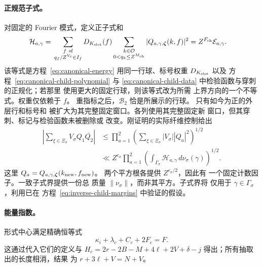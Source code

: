 \paragraph{正规范子式。}
对固定的 Fourier 模式，定义正子式和
\begin{equation}\label{eq:inverse-positive-child}
 \begin{split}
 \mathcal H_{a,\gamma}={}&
 \sum_{\substack{f\ {\rm sf}\\q_f/Z^{V_c}\in I_f}}
 D_{K_{\rm slot}}(f)
 \sum_{\substack{k\in\mathcal O\\0<q_k\le Z^{M_{\rm ch}}}}
 |Q_{a,\gamma,\boldsymbol\zeta}(k,f)|^2
 =Z^{F_{\rm ch}}\mathcal E_{a,\gamma}.
 \end{split}
\end{equation}
该等式是方程~\eqref{eq:canonical-energy} 用同一行球、标号权重
\(D_{K_{\rm slot}}\) 以及
方程~\eqref{eq:canonical-child-polynomial}
与 \eqref{eq:canonical-child-data} 中检验函数与穿刺的正规化；若那里
使用更大的固定行球，则该等式改为所需
上界方向的一个不等式。权重仅依赖于 \(f\)。
重指标之后，\(\mathcal B_2\) 恰是所展示的行球。
只有如今为正的外层行和标号和
被扩大为其完整固定窗口。各列使用其完整固定新
窗口，但其穿刺、标记与检验函数未被删除或
改变。刚证明的实际纤维控制给出
\[
 \begin{split}
 \left|\sum_{\xi\in\Xi_\sigma}V_\sigma Q_1\overline{Q_2}\right|
 &\le\prod_{a=1}^2
       \left(\sum_{\xi\in\Xi_\sigma}|V_\sigma||Q_a|^2\right)^{1/2}\\
 &\ll Z^{c_\sigma}\prod_{a=1}^2
       \left(\int_{\Gamma_\sigma}\mathcal H_{a,\gamma}
                    \,d\nu_\sigma(\gamma)\right)^{1/2}.
 \end{split}
\]
这里 \(Q_a=Q_{a,\gamma,\boldsymbol\zeta}(k_{\rm new},f_{\rm new})\)。
两个平方根各提供 \(Z^{c_\sigma/2}\)，因此有
一个固定计数因子。一致子式界提供一份总
质量 \(\|\nu_\sigma\|\)，而非其平方。子式界将
仅用于 \(\gamma\in\Gamma_\sigma\)，利用已在
方程~\eqref{eq:inverse-child-margins} 中验证的假设。

\paragraph{能量指数。}
形式中心满足精确恒等式
\begin{equation}\label{eq:canonical-prefactor}
 \kappa_i+\lambda_c+C_c+2F_c=F.
\end{equation}
这通过代入它们的定义与
\(H_c=2r-2B-M+4\ell+2V+\delta-j\) 得出；所有抽取出的长度相消，结果
为 \(r+3\ell+V=N+V\)。

